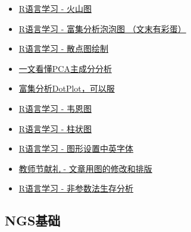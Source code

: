 \documentclass[]{article}
\numberwithin{figure}{section}
\numberwithin{table}{section}
\theoremstyle{definition}
\theoremstyle{definition}
\theoremstyle{definition}
\theoremstyle{remark}
\begin{document}
\begin{itemize}
\item
  \href{http://mp.weixin.qq.com/s?__biz=MzI5MTcwNjA4NQ==\&mid=2247483996\&idx=1\&sn=9a29d52e78e9acffeb0a78077a14f9f2\&chksm=ec0dc7d6db7a4ec0163259e81e4ded54875a5dd8adaafbc6975a86c71223d863627ba37801e5\#rd}{R语言学习
  - 火山图}
\item
  \href{http://mp.weixin.qq.com/s?__biz=MzI5MTcwNjA4NQ==\&mid=2247483978\&idx=1\&sn=e0c158c0e92375553036cc37f4987e40\&chksm=ec0dc7c0db7a4ed6ac593493b7d8b52f11f2feb92d24fa00d19527fbb6f95b24f7e313ef9440\#rd"}{R语言学习
  - 富集分析泡泡图 （文末有彩蛋）}
\item
  \href{http://mp.weixin.qq.com/s?__biz=MzI5MTcwNjA4NQ==\&mid=2247484056\&idx=1\&sn=f9b2b4f7495b432e9294b7cbf42eaf33\&chksm=ec0dc712db7a4e04769d322558364b4b401b0a8153097c7252e83170e9201a31c2a7abbaf101\#rd}{R语言学习
  - 散点图绘制}
\item
  \href{http://mp.weixin.qq.com/s?__biz=MzI5MTcwNjA4NQ==\&mid=2247484036\&idx=1\&sn=22ee356d0c9680d56dada1b777985ed2\&chksm=ec0dc70edb7a4e182a21475e9ddcde35b907c291549cc8c2e767be260af445ff5455aa358b04\#rd}{一文看懂PCA主成分分析}
\item
  \href{http://mp.weixin.qq.com/s?__biz=MzI5MTcwNjA4NQ==\&mid=2247484063\&idx=1\&sn=f4e93d428e4910b4abbee9c0430cd170\&chksm=ec0dc715db7a4e0318b388ba2ab3d51677741421c42ada474a0ac6046a0699283014eae84b6f\#rd}{富集分析DotPlot，可以服}
\item
  \href{http://mp.weixin.qq.com/s?__biz=MzI5MTcwNjA4NQ==\&mid=2247484076\&idx=1\&sn=fa5af19a2a4db4b0c5c7f145bf93ca57\&chksm=ec0dc726db7a4e30fe7a0492ed9ea8eb5fa1c34641b1442a2da003efde0546b30c48fde3f118\#rd}{R语言学习
  - 韦恩图}
\item
  \href{http://mp.weixin.qq.com/s?__biz=MzI5MTcwNjA4NQ==\&mid=2247484134\&idx=1\&sn=ffb41298eae74834af2f5dad05d37921\&chksm=ec0dc76cdb7a4e7a852ac0670532c12c690399f140a2335f640eaf01f7da26bc5480941686a9\#rd}{R语言学习
  - 柱状图}
\item
  \href{http://mp.weixin.qq.com/s/NAwyvtTS7t5rRU7KKBwHTA}{R语言学习 -
  图形设置中英字体}
\item
  \href{https://mp.weixin.qq.com/s/IJNyhinakY0lSXgCN7b9ug}{教师节献礼 -
  文章用图的修改和排版}
\item
  \href{http://mp.weixin.qq.com/s/_Dy9Yn8fc8I0rASGxH5x9A}{R语言学习 -
  非参数法生存分析}
\end{itemize}

\subsection{NGS基础}\label{ngs}
\end{document}
